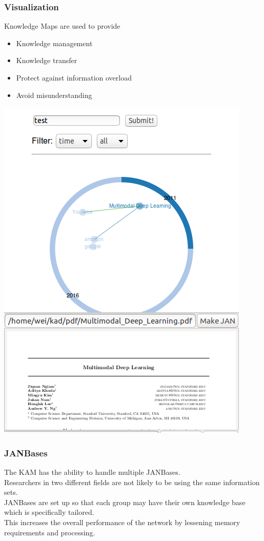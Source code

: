 \documentclass{beamer}
\begin{document}
  \begin{frame}
    \frametitle{Visualization}
    \begin{multicols}{2}
    Knowledge Maps are used to provide
    \begin{itemize}
    \item Knowledge management
    \item Knowledge transfer
    \item Protect against information overload
    \item Avoid misunderstanding 
    \end{itemize}
    \includegraphics[width=0.9\linewidth]{fig2}
    \end{multicols}
  \end{frame}
  \begin{frame}
    \frametitle{JANBases}
    The KAM has the ability to handle multiple JANBases.\\
    \medskip
    Researchers in two different fields are not likely to be using the same information sets.\\
    \medskip
    JANBases are set up so that each group may have their own knowledge base which is specifically tailored.\\
    \medskip
    This increases the overall performance of the network by lessening memory requirements and processing.
  \end{frame}
\end{document}
